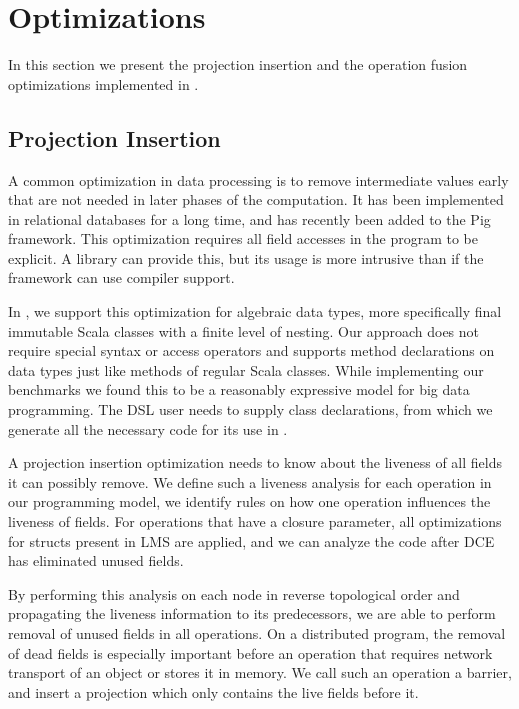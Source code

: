 \section{Optimizations}
\label{sec:optimizations}
In this section we present the projection insertion and the operation fusion
optimizations implemented in \tool.
\subsection{Projection Insertion}
\label{sec:field-reduction}
\newcommand{\aos}{AoS $\rightarrow$ SoA }

A common optimization in data processing is to remove intermediate values early
that are not needed in later phases of the computation. It has been implemented
in relational databases for a long time, and has recently been added to the Pig
framework. This optimization requires all field accesses in the program to be
explicit. A library can provide this, but its usage is more intrusive than if
the framework can use compiler support.

In \tool, we support this optimization for algebraic data types, more
specifically final immutable Scala classes with a finite level of nesting. Our
approach does not require special syntax or access operators and supports method
declarations on data types just like methods of regular Scala classes. While
implementing our benchmarks we found this to be a reasonably expressive model
for big data programming. The DSL user needs to supply class declarations, from
which we generate all the necessary code for its use in \tool.

A projection insertion optimization needs to know about the liveness of all
fields it can possibly remove. We define such a liveness analysis for each
operation in our programming model, 
we identify rules on how one operation influences the liveness of fields. For
operations that have a closure parameter, all optimizations for structs present
in LMS are applied, and we can analyze the code after DCE has eliminated unused
fields.

By performing this analysis on each node in reverse topological order and
propagating the liveness information to its predecessors, we are able to perform
removal of unused fields in all operations. On a distributed program, the
removal of dead fields is especially important before an operation that requires
network transport of an object or stores it in memory. We call such an operation
a barrier, and insert a projection which only contains the live fields before
it.

